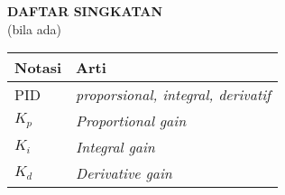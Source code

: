 \clearpage
{}
{}

\begin{center}
    \large \textbf{DAFTAR SINGKATAN} \\
    {\normalsize (bila ada)}
\end{center}
\vspace{3em}

\begin{center}
    \begin{tabularx}{0.8\textwidth} {
            >{\raggedright\arraybackslash}X
            >{\raggedright\arraybackslash}X}
        \hline
        \textbf{Notasi} & \textbf{Arti}                    \\
        \hline
        PID     & \textit{\textit{proporsional, integral, derivatif}}\\
        $K_{p}$ & \textit{Proportional gain}\\
        $K_{i}$ & \textit{Integral gain}\\
        $K_{d}$ & \textit{Derivative gain}\\
        \hline
    \end{tabularx}
\end{center}